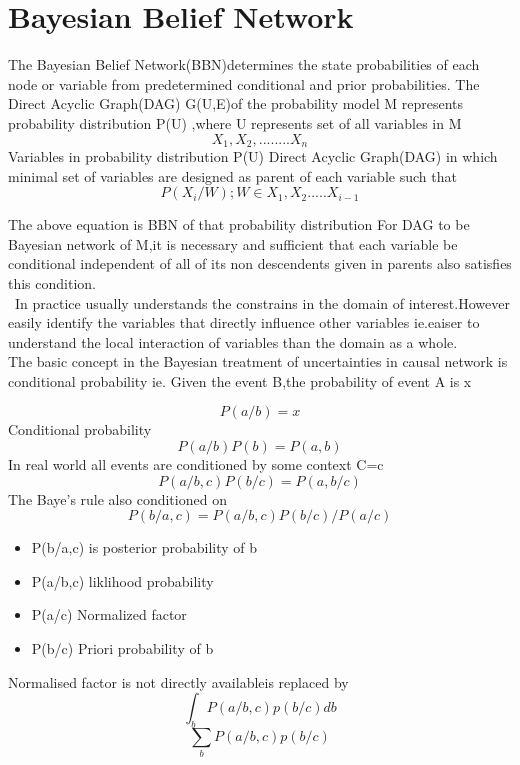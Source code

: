 \section{Bayesian Belief Network}
The Bayesian Belief Network(BBN)determines the state probabilities of each node or variable from predetermined conditional and prior probabilities.
The Direct Acyclic Graph(DAG) G(U,E)of the probability model M represents probability distribution P(U) ,where U represents set of all variables in M
\begin{equation}\label{}
   X{_1},X{_2},........X{_n}
\end{equation}
Variables in probability distribution P(U)
Direct Acyclic Graph(DAG) in which minimal set of variables are designed as parent of each variable
 such that
\begin{equation}\label{}
   P(X{_i}/W);   W\in{X{_1},X{_2}.....X{_{i-1}}}
\end{equation}

The above equation is BBN of that probability distribution
For DAG to be Bayesian network of M,it is necessary and sufficient that each variable be conditional independent of all of its non descendents given in parents also satisfies this condition.
\\\
In practice usually understands the constrains in the domain of interest.However easily identify the variables that directly influence other variables ie.eaiser to understand the local interaction of variables than the domain as a whole.
\\
The basic concept in the Bayesian treatment of uncertainties in causal network is conditional probability ie.
Given the event B,the probability of event A is x

\begin{equation}
    P(a / b) = x
\end{equation}
Conditional probability
\begin{equation}
    P(a/b)P(b)=P(a,b)
\end{equation}
In real world all events are conditioned by some context C=c
\begin{equation}
    P(a/b,c)P(b/c)=P(a,b/c)
\end{equation}
The Baye's rule also conditioned on
\begin{equation}
 P(b/a,c)={P(a/b,c)P(b/c)} / {P(a/c)}
\end{equation}
\begin{itemize}
  \item P(b/a,c) is posterior probability of b
  \item P(a/b,c) liklihood probability
  \item P(a/c) Normalized factor
  \item P(b/c) Priori probability of b
\end{itemize}
Normalised factor is not directly availableis replaced by
\begin{equation}\label{}
    \int_{b} P(a/b,c)p(b/c)db
\end{equation}
\begin{equation}
    \sum_{b}P(a/b,c)p(b/c)
\end{equation}

